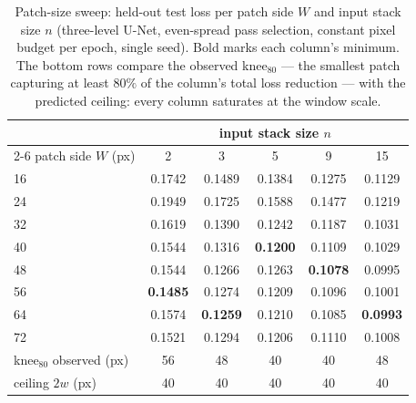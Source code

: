 \begin{table}[H]
  \centering
  \caption{Patch-size sweep: held-out test loss per patch side $W$ and input stack size $n$ (three-level U-Net, even-spread pass selection, constant pixel budget per epoch, single seed). Bold marks each column's minimum. The bottom rows compare the observed knee$_{80}$ --- the smallest patch capturing at least $80\%$ of the column's total loss reduction --- with the predicted ceiling: every column saturates at the window scale.}
  \label{tab:patch_sweep}
  \begin{tabular}{@{}l ccccc@{}}
    \toprule
    & \multicolumn{5}{c}{input stack size $n$} \\
    \cmidrule(l){2-6}
    patch side $W$ (px) & 2 & 3 & 5 & 9 & 15 \\
    \midrule
    16 & 0.1742 & 0.1489 & 0.1384 & 0.1275 & 0.1129 \\
    24 & 0.1949 & 0.1725 & 0.1588 & 0.1477 & 0.1219 \\
    32 & 0.1619 & 0.1390 & 0.1242 & 0.1187 & 0.1031 \\
    40 & 0.1544 & 0.1316 & \textbf{0.1200} & 0.1109 & 0.1029 \\
    48 & 0.1544 & 0.1266 & 0.1263 & \textbf{0.1078} & 0.0995 \\
    56 & \textbf{0.1485} & 0.1274 & 0.1209 & 0.1096 & 0.1001 \\
    64 & 0.1574 & \textbf{0.1259} & 0.1210 & 0.1085 & \textbf{0.0993} \\
    72 & 0.1521 & 0.1294 & 0.1206 & 0.1110 & 0.1008 \\
    \midrule
    knee$_{80}$ observed (px)      & 56 & 48 & 40 & 40 & 48 \\
    ceiling $2w$ (px)              & 40 & 40 & 40 & 40 & 40 \\
    \bottomrule
  \end{tabular}
\end{table}

